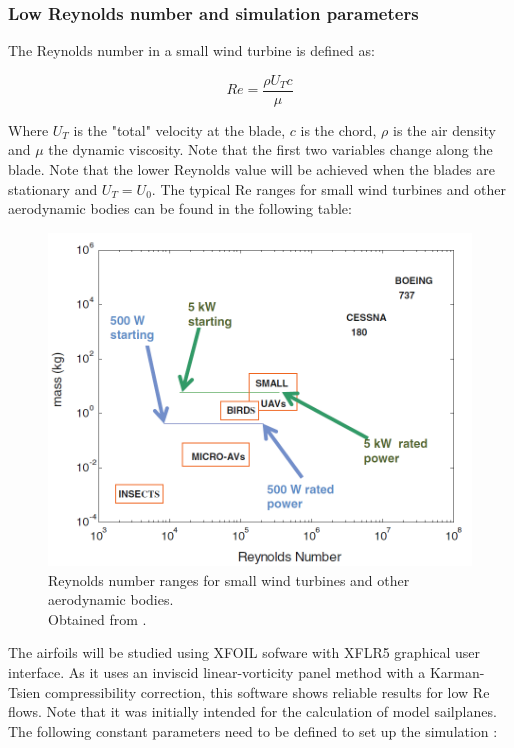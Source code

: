 \documentclass[../TFG_Report.tex]{subfiles}
\begin{document}
\subsubsection*{Low Reynolds number and simulation parameters }

The Reynolds number in a small wind turbine is defined as:

\begin{equation}
Re = \frac{\rho U_T c }{\mu}
\end{equation}

Where $U_T$ is the "total" velocity at the blade, $c$ is the chord, $\rho$ is the air density and $\mu$ the dynamic viscosity. Note that the first two variables change along the blade. Note that the lower Reynolds value will be achieved when the blades are stationary and $U_T = U_0$. The typical Re ranges for small wind turbines and other aerodynamic bodies can be found in the following table: 

\begin{figure}[h!]
	\centering
	\includegraphics[width=0.6\linewidth]{Images/Low_RE_Number}
	\caption[Reynolds number ranges]{Reynolds number ranges for small wind turbines and other aerodynamic bodies. \\
		Obtained from \cite{Wood}.}
	\label{fig:LowReNumber}
\end{figure}

\FloatBarrier

The airfoils will be studied using XFOIL sofware with XFLR5 graphical user interface. As it uses an inviscid linear-vorticity panel method with a Karman-Tsien compressibility correction, this software shows reliable results for low Re flows. Note that it was initially intended for the calculation of model sailplanes. The following constant parameters need to be defined to set up the simulation \cite{fuentes2016airfoil}: 
\end{document}
